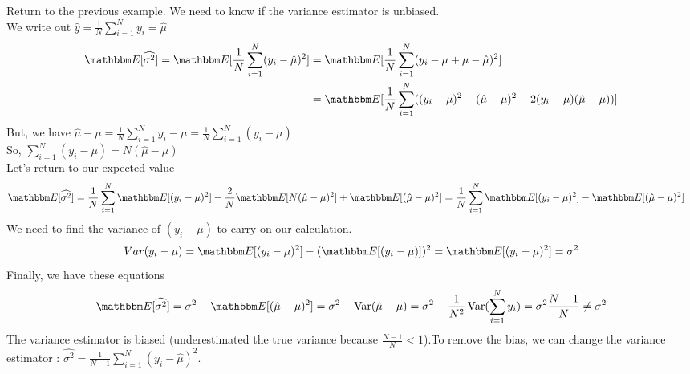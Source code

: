 \documentclass{article}
\begin{document}
\begin{example}
Return to the previous example. We need to know if the variance estimator is unbiased.\\
We write out $\hat{y} = \frac{1}{N} \sum_{i=1}^N y_i = \hat{\mu}$
\begin{equation*}
\begin{split}
   \esp[\widehat{\sigma^2}] = \esp[\frac{1}{N} \sum_{i=1}^N(y_i-\hat{\mu})^2] 
   &= \esp[\frac{1}{N} \sum_{i=1}^N(y_i-\mu + \mu - \hat{\mu})^2]\\
   &= \esp[\frac{1}{N} \sum_{i=1}^N((y_i-\mu)^2 + (\hat{\mu}-\mu)^2 - 2(y_i-\mu)(\hat{\mu}-\mu))]
   \end{split}
\end{equation*}
But, we have $\hat{\mu}-\mu = \frac{1}{N}\sum_{i=1}^N y_i-\mu = \frac{1}{N}\sum_{i=1}^N(y_i-\mu)$ \\
So, $\sum_{i=1}^N(y_i-\mu) = N(\hat{\mu}-\mu)$\\
Let's return to our expected value
\begin{equation*}
    \begin{split}
        \esp[\widehat{\sigma^2}] = \frac{1}{N} \sum_{i=1}^N \esp[(y_i-\mu)^2]-\frac{2}{N}\esp[N(\hat{\mu}-\mu)^2]+\esp[(\hat{\mu}-\mu)^2] 
        &=  \frac{1}{N} \sum_{i=1}^N\esp[(y_i-\mu)^2]-\esp[(\hat{\mu}-\mu)^2]
    \end{split}
\end{equation*}
We need to find the variance of $(y_i-\mu)$ to carry on our calculation.
\[\\Var(y_i-\mu) = \esp[(y_i-\mu)^2]-(\esp[(y_i-\mu)])^2 = \esp[(y_i-\mu)^2] = \sigma^2\]
Finally, we have these equations
\begin{equation*}
    \esp[\widehat{\sigma^2}] = \sigma^2 - \esp[(\hat{\mu}-\mu)^2] = \sigma^2 - \Var(\hat{\mu}-\mu) = \sigma^2 - \frac{1}{N^2}\Var(\sum_{i=1}^N y_i) = \sigma^2\frac{N-1}{N} \ne \sigma^2
\end{equation*}
The variance estimator is biased (underestimated the true variance because $\frac{N-1}{N}<1$).To remove the bias, we can change the variance estimator : $\widehat{\sigma^2} = \frac{1}{N-1}\sum_{i=1}^N (y_i-\hat{\mu})^2$.
\end{example}
\end{document}

